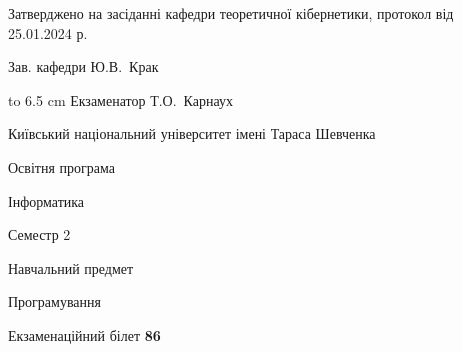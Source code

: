 \documentclass[12pt, ukrainian]{article}
\begin{document}
{\smallskip\smallskip \begin {scriptsize} Затверджено на засіданні кафедри теоретичної кібернетики, протокол   від   25.01.2024 р.\par\smallskip\smallskip\smallskip\smallskip
{\parbox {6.5 cm} {Зав. кафедри \dotfill Ю.В.~Крак}}\hspace {0.7cm} {\hbox to 6.5 cm { Екзаменатор \dotfill Т.О.~Карнаух}} \end{scriptsize}}
\newpage
{{\begin {scriptsize}\par
{ \center  Київський національний університет імені Тараса Шевченка \par}
{\parbox {5 cm}{Освітня програма \hfill}{\parbox {7 cm}{Інформатика\hfill}}\parbox {6 cm}{\hfill Семестр 2}}\par
{\parbox {5 cm} {Навчальний предмет \hfill}\parbox {7 cm}{Програмування \hfill}\parbox {6cm}{\hfill}\par}\vspace{-15pt} \end{scriptsize}}{\center Екзаменаційний білет \No \textbf { 86 }\par}}
\end{document}
